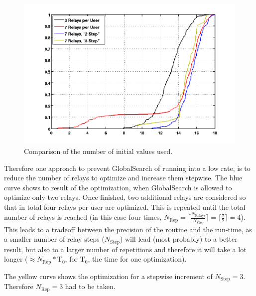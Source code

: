 \begin{figure}[h]
\centering
  \includegraphics[width=0.9\linewidth]{images/Relstepcomparison.png}
\caption{Comparison of the number of initial values used.}
\label{fig:nrel7}
\end{figure}

Therefore one approach to prevent GlobalSearch of running into a low rate, is to reduce the number of relays to optimize and increase them stepwise.
The blue curve shows to result of the optimization, when GlobalSearch is allowed to optimize only two relays.
Once finished, two additional relays are considered so that in total four relays per user are optimized.
This is repeated until the total number of relays is reached (in this case four times, $N_{\text{Rep}} = \lceil\frac{N_{\text{Relays}}}{N_{\text{Step}}}\rceil = \lceil\frac{7}{2}\rceil=4$).
This leads to a tradeoff between the precision of the routine and the run-time, as a smaller number of relay steps ($ N_{\text{Step}}$) will lead (most probably) to a better result, but also to a larger number of repetitions and therefore it will take a lot longer ($\approx N_{\text{Rep}}*\text{T}_0$, for $\text{T}_0$, the time for one optimization).

The yellow curve shows the optimization for a stepwise increment of $N_{\text{Step}}=3$.
Therefore $N_{\text{Rep}} = 3$ had to be taken.




